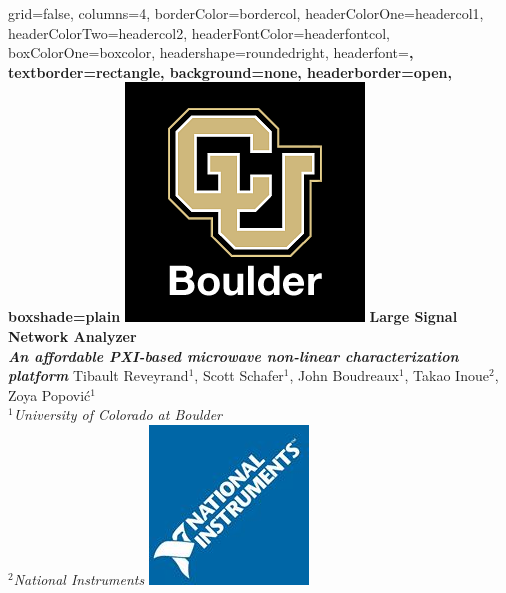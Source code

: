 \documentclass[a0paper,portrait]{baposter}
\begin{document}
\begin{poster}{
grid=false,
columns=4,
borderColor=bordercol, %
headerColorOne=headercol1, %
headerColorTwo=headercol2, %
headerFontColor=headerfontcol, %
boxColorOne=boxcolor, %
headershape=roundedright, %
headerfont=\Large\sf\bf, %
textborder=rectangle,
background=none,
headerborder=open, %
boxshade=plain
}
{\includegraphics[scale=0.3]{CU.png}}
%
%
{ \bf  \huge {Large Signal Network Analyzer} \\  \Large \it An affordable PXI-based microwave non-linear characterization platform} %
{\vspace{0.3em} \smaller Tibault Reveyrand$^1$, Scott Schafer$^1$, John Boudreaux$^1$, Takao Inoue$^2$, Zoya Popovi\'c$^1$   \\  %
  
\smaller $^1$\it {University of Colorado at Boulder} \\ $^2$\it{National Instruments} } %
{\includegraphics[scale=0.45]{NI.jpg}} %


\end{poster}
\end{document}
